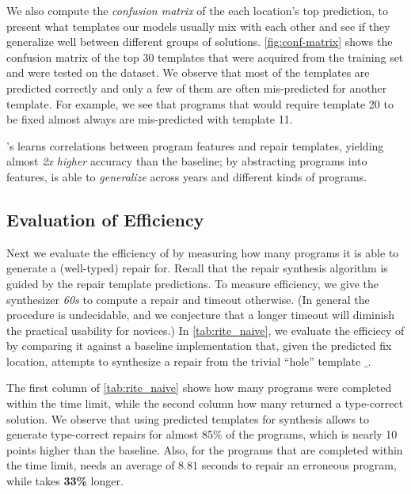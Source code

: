 %
We also compute the \emph{confusion matrix} of the each location's
top prediction, to present what templates our models usually mix
with each other and see if they generalize well between different
groups of solutions.
%
\autoref{fig:conf-matrix} shows the confusion matrix of the
top 30 templates that were acquired from the training set
and were tested on the \FALL dataset.
%
We observe that most of the templates are predicted correctly
and only a few of them are often mis-predicted for another template.
%
For example, we see that programs that would require template 20
to be fixed almost always are mis-predicted with template 11.


\begin{framed}
  \noindent \toolname's learns correlations between program features and repair
  templates, yielding almost \emph{2x higher} accuracy than the baseline;
  by abstracting programs into features, \toolname is able
  to \emph{generalize} across years and different kinds of programs.
\end{framed}


\subsection{Evaluation of Efficiency}
\label{sec:eval:efficiency}
\label{subsec:eval:man_rep_qual_eval}

Next we evaluate the efficiency of \toolname by measuring how many
programs it is able to generate a (well-typed) repair for.
%
Recall that the repair synthesis algorithm is guided by the
repair template predictions.
%
To measure efficiency, we give the synthesizer \emph{60s} to
compute a repair and timeout otherwise. (In general the procedure
is undecidable, and we conjecture that a longer timeout will diminish
the practical usability for novices.)
%
In \autoref{tab:rite_naive}, we evaluate the efficiecy of \toolname
by comparing it against a baseline \naive implementation that, given
the predicted fix location, attempts to synthesize a repair from the
trivial ``hole'' template $\_$.

The first column of \autoref{tab:rite_naive} shows how many
programs were completed within the time limit, while the second
column how many returned a type-correct solution.
%
We observe that using predicted templates for synthesis allows
\toolname to generate type-correct repairs for almost 85\% of
the programs, which is nearly 10 points higher than the \naive
baseline. Also, for the programs that are completed within
the time limit, \toolname needs an average of $8.81$ seconds
to repair an erroneous program, while \naive takes
\textbf{33\%} longer.

